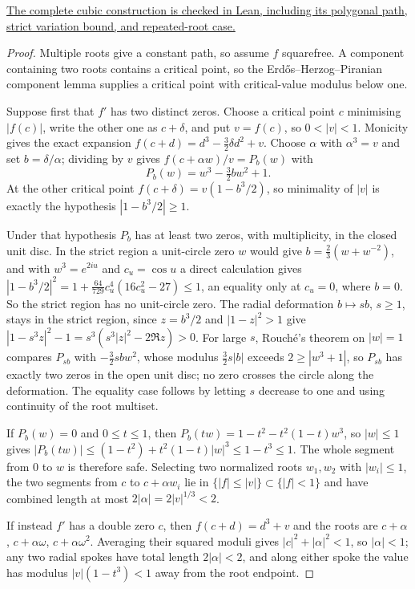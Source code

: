 \documentclass[11pt]{article}
\begin{document}
\noindent\href{https://github.com/wcook04/plectis-erdos/blob/bb4e24651b37cd096d3749ef299c3317930b3a3b/ErdosProblems/Erdos1041/PaperCubicCompletion.lean#L297}{The complete cubic construction is checked in Lean, including its polygonal path, strict variation bound, and repeated-root case.}


\begin{proof}
Multiple roots give a constant path, so assume $f$ squarefree.  A component
containing two roots contains a critical point, so the
Erd\H{o}s--Herzog--Piranian component lemma \cite[p.~139]{ehp1958} supplies a
critical point with critical-value modulus below one.

Suppose first that $f'$ has two distinct zeros.  Choose a critical point $c$
minimising $|f(c)|$, write the other one as $c+\delta$, and put $v=f(c)$, so
$0<|v|<1$.  Monicity gives the exact expansion
$f(c+d)=d^3-\tfrac32\delta d^2+v$.  Choose $\alpha$ with $\alpha^3=v$ and set
$b=\delta/\alpha$; dividing by $v$ gives
$f(c+\alpha w)/v=P_b(w)$ with
\[
 P_b(w)=w^3-\tfrac32bw^2+1 .
\]
At the other critical point $f(c+\delta)=v(1-b^3/2)$, so minimality of $|v|$
is exactly the hypothesis $|1-b^3/2|\ge1$.

Under that hypothesis $P_b$ has at least two zeros, with multiplicity, in the
closed unit disc.  In the strict region a unit-circle zero $w$ would give
$b=\tfrac23(w+w^{-2})$, and with $w^3=e^{2iu}$ and $c_u=\cos u$ a direct
calculation gives $|1-b^3/2|^2=1+\tfrac{64}{729}c_u^4(16c_u^2-27)\le1$, an
equality only at $c_u=0$, where $b=0$.  So the strict region has no
unit-circle zero.  The radial deformation $b\mapsto sb$, $s\ge1$, stays in
the strict region, since $z=b^3/2$ and $|1-z|^2>1$ give
$|1-s^3z|^2-1=s^3(s^3|z|^2-2\Re z)>0$.  For large $s$, Rouch\'e's theorem on
$|w|=1$ compares $P_{sb}$ with $-\tfrac32sbw^2$, whose modulus
$\tfrac32s|b|$ exceeds $2\ge|w^3+1|$, so $P_{sb}$ has exactly two zeros in
the open unit disc; no zero crosses the circle along the deformation.  The
equality case follows by letting $s$ decrease to one and using continuity of
the root multiset.

If $P_b(w)=0$ and $0\le t\le1$, then
$P_b(tw)=1-t^2-t^2(1-t)w^3$, so $|w|\le1$ gives
$|P_b(tw)|\le(1-t^2)+t^2(1-t)|w|^3\le1-t^3\le1$.  The whole segment from $0$
to $w$ is therefore safe.  Selecting two normalized roots $w_1,w_2$ with
$|w_i|\le1$, the two segments from $c$ to $c+\alpha w_i$ lie in
$\{|f|\le|v|\}\subset\{|f|<1\}$ and have combined length at most
$2|\alpha|=2|v|^{1/3}<2$.

If instead $f'$ has a double zero $c$, then $f(c+d)=d^3+v$ and the roots are
$c+\alpha$, $c+\alpha\omega$, $c+\alpha\omega^2$.  Averaging their squared
moduli gives $|c|^2+|\alpha|^2<1$, so $|\alpha|<1$; any two radial spokes
have total length $2|\alpha|<2$, and along either spoke the value has modulus
$|v|(1-t^3)<1$ away from the root endpoint.
\end{proof}
\end{document}
